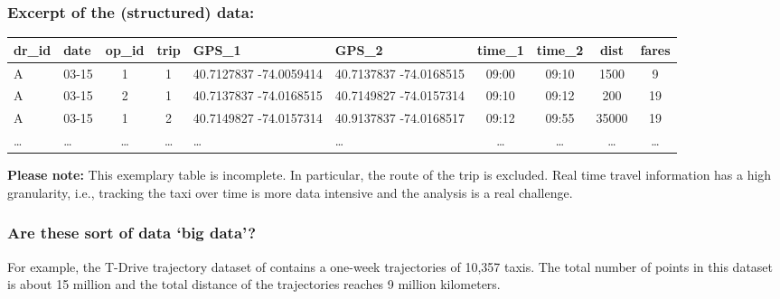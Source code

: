 \subsubsection{Excerpt of the (structured) data:}
\begin{tabularx}{\linewidth}{llCCllCCCC}\toprule
dr\_id & date       & op\_id & trip &GPS\_1             & GPS\_2               & time\_1 & time\_2 & dist & fares  \\\midrule
A          & 03-15 & 1  &      1     & 40.7127837 -74.0059414 & {40.7137837 -74.0168515} & 09:00       & 09:10     & 1500     & 9                \\\hline
A          & 03-15 & 2 &        1    & 40.7137837 -74.0168515 & 40.7149827 -74.0157314 & 09:10       & 09:12     & 200      & 19                   \\\hline
A          & 03-15 & 1 &    2        & 40.7149827 -74.0157314 & 40.9137837 -74.0168517 & 09:12       & 09:55     & 35000    & 19 \\\hline
\dots         & \dots& \dots&\dots         & \dots&\dots         & \dots&\dots  &\dots  &\dots     \\\bottomrule
\end{tabularx}

\textbf{Please note:} This exemplary table is incomplete. In particular, the route of the trip is excluded. Real time travel information has a high granularity, i.e., tracking the taxi over time is more data intensive and the analysis is a real challenge.

\pbn
\subsubsection*{Are these sort of data `big data'?} 
For example, the T-Drive trajectory dataset of \cite{Zheng2011T} contains a one-week trajectories of 10,357 taxis. The total number of points in this dataset is about 15 million and the total distance of the trajectories reaches 9 million kilometers.

\pbn
{}


